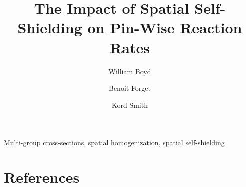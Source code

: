 \documentclass[authoryear,5p]{elsarticle}
\begin{document}
\begin{frontmatter}

\title{The Impact of Spatial Self-Shielding on Pin-Wise Reaction Rates}

\author{William Boyd}

\author{Benoit Forget\corref{}}

\author{Kord Smith\corref{}}

\address{Massachusetts Institute of Technology, Department of Nuclear Science and Engineering, 77 Massachusetts Avenue, Building 24, Cambridge, MA 02139, United States\vspace{-8ex}}


\begin{abstract}

\end{abstract}

\begin{keyword}
Multi-group cross-sections, spatial homogenization, spatial self-shielding
\end{keyword}

\end{frontmatter}








\section*{References}


\end{document}
